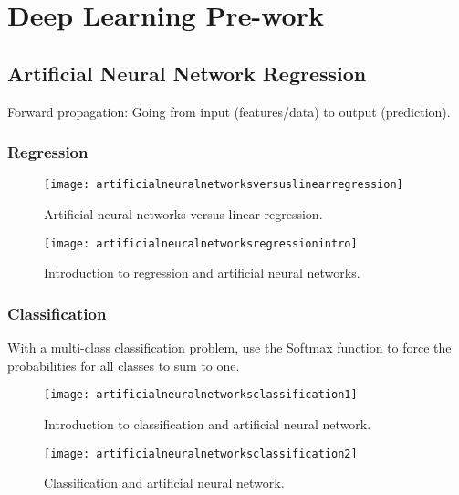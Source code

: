	\chapter{Deep Learning Pre-work}
	\section{Artificial Neural Network Regression}

Forward propagation: Going from input (features/data) to output (prediction).

	\subsection{Regression}
 	\begin{figure}[h]
		\centering
		\texttt{[image: artificialneuralnetworksversuslinearregression]}
		\caption[Artificial neural networks versus linear regression]{Artificial neural networks versus linear regression.}
		\label{fig:artificialneuralnetworksversuslinearregression}
	\end{figure}


 	\begin{figure}[h]
		\centering
		\texttt{[image: artificialneuralnetworksregressionintro]}
		\caption[Introduction to regression and artificial neural networks]{Introduction to regression and artificial neural networks.}
		\label{fig:artificialneuralnetworksregressionintro}
	\end{figure}

	\subsection{Classification}
With a multi-class classification problem, use the Softmax function to force the probabilities for all classes to sum to one.

 	\begin{figure}[h]
		\centering
		\texttt{[image: artificialneuralnetworksclassification1]}
		\caption[Introduction to classification and artificial neural network]{Introduction to classification and artificial neural network.}
		\label{fig:artificialneuralnetworksclassification1}
	\end{figure}

 	\begin{figure}[h]
		\centering
		\texttt{[image: artificialneuralnetworksclassification2]}
		\caption[Classification and artificial neural network]{Classification and artificial neural network.}
		\label{fig:artificialneuralnetworksclassification2}
	\end{figure}

